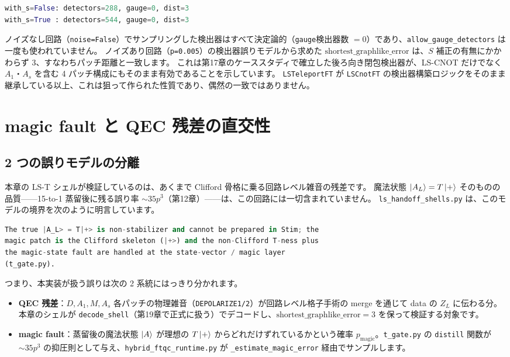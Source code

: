 \begin{lstlisting}[language=Python, caption={LS-T シェルの gauge 検出器数と距離（実行結果）}]
with_s=False: detectors=288, gauge=0, dist=3
with_s=True : detectors=544, gauge=0, dist=3
\end{lstlisting}

ノイズなし回路（\texttt{noise=False}）でサンプリングした検出器はすべて決定論的（\texttt{gauge}検出器数 $=0$）であり、\texttt{allow\_gauge\_detectors} は一度も使われていません。
ノイズあり回路（\texttt{p=0.005}）の検出器誤りモデルから求めた $\mathrm{shortest\_graphlike\_error}$ は、$S$ 補正の有無にかかわらず 3、すなわちパッチ距離と一致します。
これは第17章のケーススタディで確立した後ろ向き閉包検出器が、LS-CNOT だけでなく $A_1$・$A_s$ を含む 4 パッチ構成にもそのまま有効であることを示しています。
\texttt{LSTeleportFT} が \texttt{LSCnotFT} の検出器構築ロジックをそのまま継承している以上、これは狙って作られた性質であり、偶然の一致ではありません。

\section{magic fault と QEC 残差の直交性}\label{sec:orthogonal}

\subsection{2 つの誤りモデルの分離}

本章の LS-T シェルが検証しているのは、あくまで Clifford 骨格に乗る回路レベル雑音の残差です。
魔法状態 $\ket{A_L}=T\ket{+}$ そのものの品質——15-to-1 蒸留後に残る誤り率 $\sim35p^3$（第12章）——は、この回路には一切含まれていません。
\texttt{ls\_handoff\_shells.py} は、このモデルの境界を次のように明言しています。

\begin{lstlisting}[language=Python, caption={魔法状態の忠実度は別モデル（\codepath{src/stages/02_circuit_level/src/ftqc/ls_handoff_shells.py}）}]
The true |A_L> = T|+> is non-stabilizer and cannot be prepared in Stim; the
magic patch is the Clifford skeleton (|+>) and the non-Clifford T-ness plus
the magic-state fault are handled at the state-vector / magic layer
(t_gate.py).
\end{lstlisting}

つまり、本実装が扱う誤りは次の 2 系統にはっきり分かれます。

\begin{itemize}
  \item \textbf{QEC 残差}：$D,A_1,M,A_s$ 各パッチの物理雑音（\texttt{DEPOLARIZE1/2}）が回路レベル格子手術の merge を通じて data の $Z_L$ に伝わる分。本章のシェルが \texttt{decode\_shell}（第19章で正式に扱う）でデコードし、$\mathrm{shortest\_graphlike\_error}=3$ を保って検証する対象です。
  \item \textbf{magic fault}：蒸留後の魔法状態 $\ket{A}$ が理想の $T\ket{+}$ からどれだけずれているかという確率 $p_{\text{magic}}$。\texttt{t\_gate.py} の \texttt{distill} 関数が $\sim35p^3$ の抑圧則として与え、\texttt{hybrid\_ftqc\_runtime.py} が \texttt{\_estimate\_magic\_error} 経由でサンプルします。
\end{itemize}

